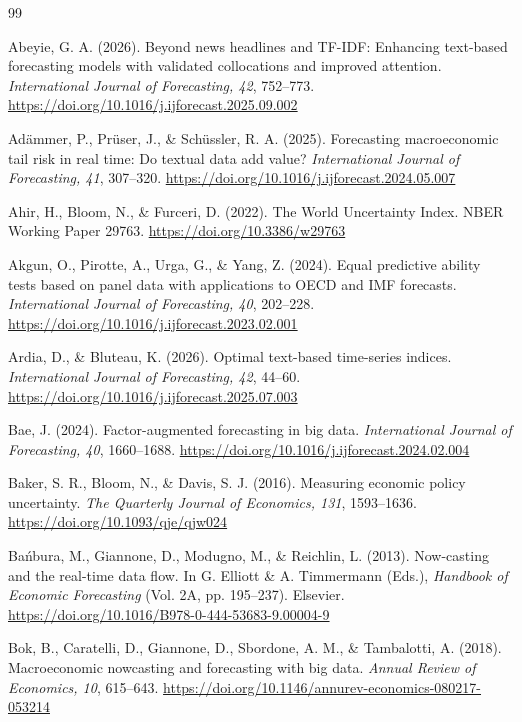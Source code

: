 \documentclass[preprint,12pt,authoryear]{elsarticle}
\begin{document}
\begingroup
\normalsize
\setlength{\bibsep}{0pt plus 0.2ex}
\begin{thebibliography}{99}

Abeyie, G. A. (2026). Beyond news headlines and TF-IDF: Enhancing text-based
forecasting models with validated collocations and improved attention.
\emph{International Journal of Forecasting, 42}, 752--773.
\url{https://doi.org/10.1016/j.ijforecast.2025.09.002}

Ad{\"a}mmer, P., Pr{\"u}ser, J., \& Sch{\"u}ssler, R. A. (2025). Forecasting
macroeconomic tail risk in real time: Do textual data add value?
\emph{International Journal of Forecasting, 41}, 307--320.
\url{https://doi.org/10.1016/j.ijforecast.2024.05.007}

Ahir, H., Bloom, N., \& Furceri, D. (2022). The World Uncertainty Index.
NBER Working Paper 29763. \url{https://doi.org/10.3386/w29763}

Akgun, O., Pirotte, A., Urga, G., \& Yang, Z. (2024). Equal predictive ability
tests based on panel data with applications to OECD and IMF forecasts.
\emph{International Journal of Forecasting, 40}, 202--228.
\url{https://doi.org/10.1016/j.ijforecast.2023.02.001}

Ardia, D., \& Bluteau, K. (2026). Optimal text-based time-series indices.
\emph{International Journal of Forecasting, 42}, 44--60.
\url{https://doi.org/10.1016/j.ijforecast.2025.07.003}

Bae, J. (2024). Factor-augmented forecasting in big data.
\emph{International Journal of Forecasting, 40}, 1660--1688.
\url{https://doi.org/10.1016/j.ijforecast.2024.02.004}

Baker, S. R., Bloom, N., \& Davis, S. J. (2016). Measuring economic policy
uncertainty. \emph{The Quarterly Journal of Economics, 131}, 1593--1636.
\url{https://doi.org/10.1093/qje/qjw024}

Ba{\'n}bura, M., Giannone, D., Modugno, M., \& Reichlin, L. (2013).
Now-casting and the real-time data flow. In G. Elliott \& A. Timmermann
(Eds.), \emph{Handbook of Economic Forecasting} (Vol. 2A, pp. 195--237).
Elsevier. \url{https://doi.org/10.1016/B978-0-444-53683-9.00004-9}

Bok, B., Caratelli, D., Giannone, D., Sbordone, A. M., \& Tambalotti, A.
(2018). Macroeconomic nowcasting and forecasting with big data. \emph{Annual
Review of Economics, 10}, 615--643.
\url{https://doi.org/10.1146/annurev-economics-080217-053214}


\end{thebibliography}
\end{document}

